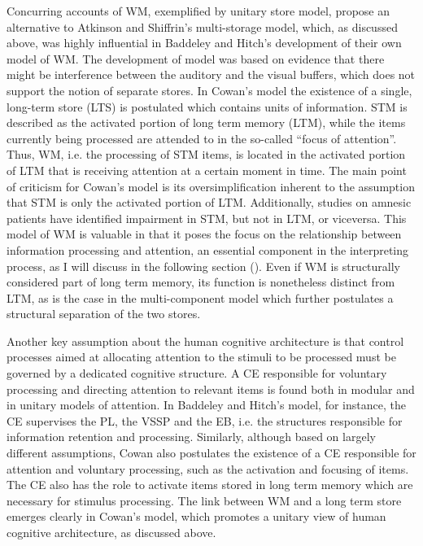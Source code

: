 Concurring accounts of WM, exemplified by  unitary store model, propose an alternative to Atkinson and Shiffrin's multi-storage model, which, as discussed above, was highly influential in Baddeley and Hitch's development of their own model of WM. The development of  model was based on evidence that there might be interference between the auditory and the visual buffers, which does not support the notion of separate stores. In Cowan's model the existence of a single, long-term store (LTS) is postulated which contains units of information. STM is described as the activated portion of long term memory (LTM), while the items currently being processed are attended to in the so-called ``focus of attention''. Thus, WM, i.e. the processing of STM items, is located in the activated portion of LTM that is receiving attention at a certain moment in time. The main point of criticism for Cowan's model is its oversimplification inherent to the assumption that STM is only the activated portion of LTM. Additionally, studies on amnesic patients have identified impairment in STM, but not in LTM, or viceversa.
This model of WM is valuable in that it poses the focus on the relationship between information processing and attention, an essential component in the interpreting process, as I will discuss in the following section (). Even if WM is structurally considered part of long term memory, its function is nonetheless distinct from LTM, as is the case in the multi-component model which further postulates a structural separation of the two stores.


Another key assumption about the human cognitive architecture is that control processes aimed at allocating attention to the stimuli to be processed must be governed by a dedicated cognitive structure. A CE responsible for voluntary processing and directing attention to relevant items is found both in modular and in unitary models of attention. In Baddeley and Hitch's model, for instance, the CE supervises the PL, the VSSP and the EB, i.e. the structures responsible for information retention and processing. Similarly, although based on largely different assumptions, Cowan also postulates the existence of a CE responsible for attention and voluntary processing, such as the activation and focusing of items. The CE also has the role to activate items stored in long term memory which are necessary for stimulus processing. The link between WM and a long term store emerges clearly in Cowan's model, which promotes a unitary view of human cognitive architecture, as discussed above.

